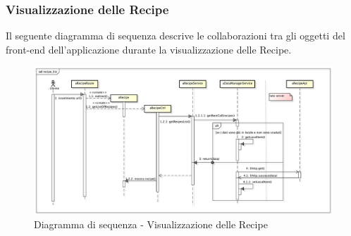 	\subsubsection{Visualizzazione delle Recipe} %
	\label{ssub:visualizzazione_delle_recipe}
	Il seguente diagramma di sequenza descrive le collaborazioni tra gli oggetti del front-end dell'applicazione durante la visualizzazione delle Recipe. \newline

\begin{figure}[htbp]
	\centering
	\centerline{\includegraphics[scale=0.4]{./images/sequence_diagram/client_view_recipe.pdf}}
	\caption{Diagramma di sequenza - Visualizzazione delle Recipe}
\end{figure}



